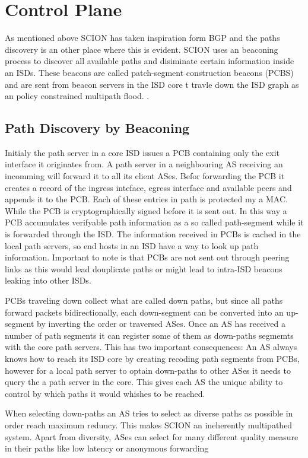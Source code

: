 \documentclass[../eva1_scion.tex]{subfiles}
\begin{document}
    \section{Control Plane}
    As mentioned above SCION has taken inspiration form BGP and the paths discovery is an other place where this is evident. SCION uses an beaconing process to discover all available paths and disiminate certain information inside an ISDs.  These beacons are called patch-segment construction beacons (PCBS) and are  sent from beacon servers in the ISD core t travle down the ISD graph as an policy constrained multipath flood. \cite{scion_2011}.

    \subsection{Path Discovery by Beaconing}\label{ssec:beaconing}
    Initialy the path server in a core ISD issues a PCB containing only the exit interface it originates from. A path server in a neighbouring AS receiving an incomming will forward it to all its client ASes. Befor forwarding the PCB it creates a  record of the ingress inteface, egress interface and available peers and appends it to the PCB. Each of these entries in path is protected my a MAC. While the PCB is cryptographically signed before it is sent out. In this way a PCB accumulates verifyable path information as a so called path-segment while it is forwarded through the ISD. The information received in PCBs is cached in the local path servers, so end hosts in an ISD have a way to look up path information. Important to note is that PCBs are not sent out through peering links as this would lead douplicate paths or might lead to intra-ISD beacons leaking into other ISDs.

    PCBs traveling down collect what are called down paths, but since all paths forward packets bidirectionally, each down-segment can be converted into an up-segment by inverting the order or traversed ASes. Once an AS has received a number of path segments it can register some of them as down-paths segmemts with the core path servers. This has two important consequences:  An AS always knows how to reach its ISD core by creating recoding path segments from PCBs, however for a local path server to optain down-paths to other ASes it needs to query the a path server in the core. This gives each AS the unique ability to control by which paths it would whishes to be reached.

    When selecting down-paths an AS tries to select as diverse paths as possible in order reach maximum reduncy. This makes SCION an ineherently multipathed system. Apart from diversity, ASes can select for many different quality measure in their paths like low latency or anonymous forwarding
\end{document}
